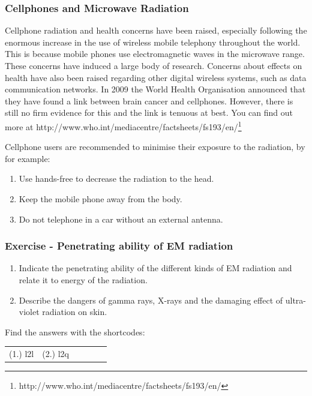             \subsubsection{ Cellphones and Microwave Radiation}
            \nopagebreak
            \label{m38779*id189654}Cellphone radiation and health concerns have been raised, especially following the enormous increase in the use of wireless mobile telephony throughout the world. This is because mobile phones use electromagnetic waves in the microwave range. These concerns have induced a large body of research. Concerns about effects on health have also been raised regarding other digital wireless systems, such as data communication networks.
In 2009 the World Health Organisation announced that they have found a link between brain cancer and cellphones. However, there is still no firm evidence for this and the link is tenuous at best. You can find out more at http://www.who.int/mediacentre/factsheets/fs193/en/\footnote{http://www.who.int/mediacentre/factsheets/fs193/en/}
        \par 
        \label{m38779*id189664}Cellphone users are recommended to minimise their exposure to the radiation, by for example:\par 
        \label{m38779*id189668}\begin{enumerate}[noitemsep, label=\textbf{\arabic*}. ] 
            \label{m38779*uid24}\item Use hands-free to decrease the radiation to the head.
\label{m38779*uid25}\item Keep the mobile phone away from the body.
\label{m38779*uid26}\item Do not telephone in a car without an external antenna.
\end{enumerate}
        \label{m38779*uid27}
            \subsubsection{ Exercise - Penetrating ability of EM radiation}
            \nopagebreak
        \label{m38779*id189729}\begin{enumerate}[noitemsep, label=\textbf{\arabic*}. ] 
            \label{m38779*uid28}\item Indicate the penetrating ability of the different kinds of EM radiation and relate it to energy of the radiation.\newline
\label{m38779*uid29}\item Describe the dangers of gamma rays, X-rays and the damaging effect of ultra-violet radiation on skin.\newline
\end{enumerate}
    \label{m38779*cid8}
\par {} Find the answers with the shortcodes:
 \par \begin{tabular}[h]{cccccc}
 (1.) l2l  &  (2.) l2q  & \end{tabular}
